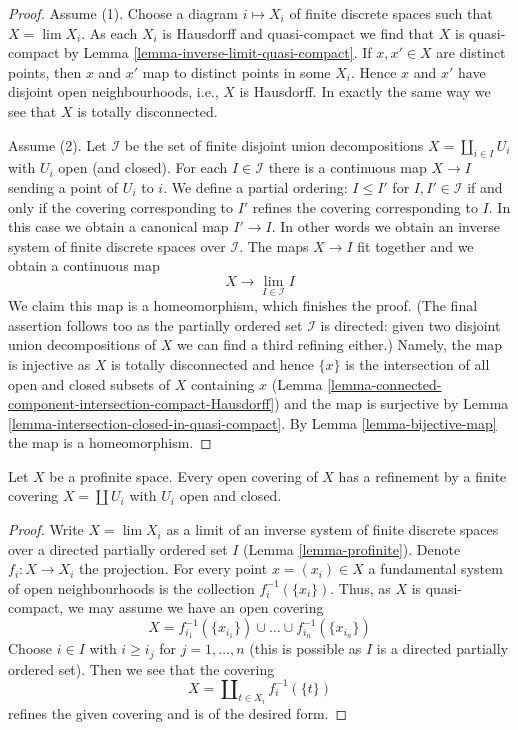 \begin{proof}
Assume (1). Choose a diagram $i \mapsto X_i$ of finite discrete spaces
such that $X = \lim X_i$. As each $X_i$ is Hausdorff and quasi-compact we find
that $X$ is quasi-compact by Lemma \ref{lemma-inverse-limit-quasi-compact}.
If $x, x' \in X$ are distinct points, then $x$ and $x'$ map to
distinct points in some $X_i$. Hence $x$ and $x'$ have disjoint
open neighbourhoods, i.e., $X$ is Hausdorff. In exactly the same way
we see that $X$ is totally disconnected.

\medskip\noindent
Assume (2). Let $\mathcal{I}$ be the set of finite disjoint union
decompositions $X = \coprod_{i \in I} U_i$ with $U_i$ open (and closed).
For each $I \in \mathcal{I}$ there is a continuous map
$X \to I$ sending a point of $U_i$ to $i$. We define a partial
ordering: $I \leq I'$ for $I, I' \in \mathcal{I}$ if and only
if the covering corresponding to $I'$ refines the covering corresponding
to $I$. In this case we obtain a canonical map $I' \to I$. In other
words we obtain an inverse system of finite discrete spaces over $\mathcal{I}$.
The maps $X \to I$ fit together and we obtain a continuous map
$$
X \longrightarrow \lim_{I \in \mathcal{I}} I
$$
We claim this map is a homeomorphism, which finishes the proof.
(The final assertion follows too as the partially ordered set
$\mathcal{I}$ is directed: given two disjoint union decompositions
of $X$ we can find a third refining either.)
Namely, the map is injective as $X$ is totally disconnected
and hence $\{x\}$ is the intersection of all open and closed subsets
of $X$ containing $x$
(Lemma \ref{lemma-connected-component-intersection-compact-Hausdorff})
and  the map is surjective by
Lemma \ref{lemma-intersection-closed-in-quasi-compact}.
By Lemma \ref{lemma-bijective-map} the map is a homeomorphism.
\end{proof}

\begin{lemma}
\label{lemma-profinite-refine-open-covering}
Let $X$ be a profinite space. Every open covering of $X$ has a refinement
by a finite covering $X = \coprod U_i$ with $U_i$ open and closed.
\end{lemma}

\begin{proof}
Write $X = \lim X_i$ as a limit of an inverse system of finite discrete
spaces over a directed partially ordered set $I$ (Lemma \ref{lemma-profinite}).
Denote $f_i : X \to X_i$ the projection.
For every point $x = (x_i) \in X$ a fundamental system of open neighbourhoods
is the collection $f_i^{-1}(\{x_i\})$. Thus, as $X$ is quasi-compact, we may
assume we have an open covering
$$
X = f_{i_1}^{-1}(\{x_{i_1}\}) \cup \ldots \cup f_{i_n}^{-1}(\{x_{i_n}\})
$$
Choose $i \in I$ with $i \geq i_j$ for $j = 1, \ldots, n$ (this is possible
as $I$ is a directed partially ordered set). Then we see
that the covering
$$
X = \coprod\nolimits_{t \in X_i} f_i^{-1}(\{t\})
$$
refines the given covering and is of the desired form.
\end{proof}

